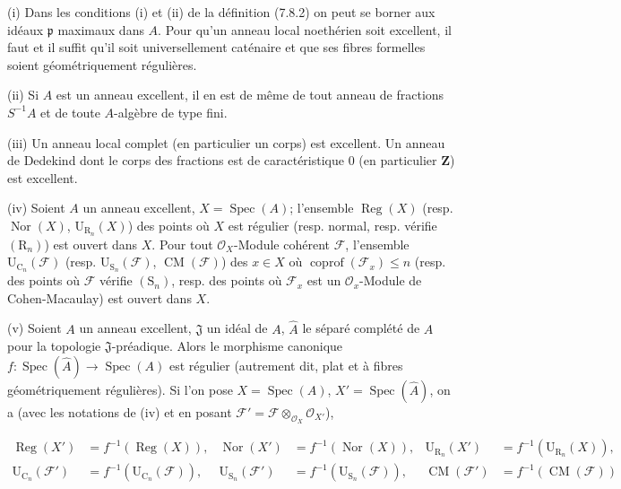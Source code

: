 \begin{scholium}[7.8.3]
\textup{(i)} Dans les conditions \textup{(i)} et \textup{(ii)} de la définition \textup{(7.8.2)} on peut se borner
aux idéaux $\mathfrak p$ maximaux dans $A$. Pour qu'un anneau \textup{local} noethérien
soit excellent, il faut et
il suffit qu'il soit universellement caténaire et que ses fibres formelles
soient géométriquement régulières.

\textup{(ii)} Si $A$ est un anneau excellent, il en est de même de tout anneau de
fractions $S^{-1}A$ et de toute $A$-algèbre de type fini.

\textup{(iii)} Un anneau local complet (en particulier un corps) est excellent. Un
anneau de Dedekind dont le corps des fractions est de caractéristique $0$ (en
particulier $\mathbf Z$) est excellent.

\textup{(iv)} Soient $A$ un anneau excellent, $X=\operatorname{Spec}(A)$; l'ensemble
$\operatorname{Reg}(X)$ \textup{(resp.} $\operatorname{Nor}(X)$,
$\mathrm U_{\mathrm R_n}(X)$) des points où $X$ est régulier \textup{(resp.} normal,
\textup{resp.} vérifie $(\mathrm R_n)$) est ouvert dans $X$. Pour tout
$\mathcal O_X$-Module cohérent $\mathcal F$, l'ensemble
$\mathrm U_{\mathrm C_n}(\mathcal F)$ \textup{(resp.}
$\mathrm U_{\mathrm S_n}(\mathcal F)$, $\operatorname{CM}(\mathcal F)$) des
$x\in X$ où $\operatorname{coprof}(\mathcal F_x)\leq n$ \textup{(resp.} des points où
$\mathcal F$ vérifie $(\mathrm S_n)$, \textup{resp.} des points où $\mathcal F_x$ est un
$\mathcal O_x$-Module de Cohen-Macaulay) est ouvert dans $X$.

\textup{(v)} Soient $A$ un anneau excellent, $\mathfrak J$ un idéal de $A$,
$\widehat A$ le séparé complété de $A$ pour la topologie $\mathfrak J$-préadique.
Alors le morphisme canonique
$f:\operatorname{Spec}(\widehat A)\to\operatorname{Spec}(A)$ est régulier
\textup{(autrement dit,} plat \textup{et à fibres} géométriquement régulières). Si l'on pose
$X=\operatorname{Spec}(A)$, $X'=\operatorname{Spec}(\widehat A)$, on a (avec
les notations de \textup{(iv)} et en posant
$\mathcal F'=\mathcal F\otimes_{\mathcal O_X}\mathcal O_{X'}$),
\begin{env}[7.8.3.1]
\label{IV.2.s7.8.3.1-fr}
\begin{align*}
\operatorname{Reg}(X')&=f^{-1}(\operatorname{Reg}(X)),&
\operatorname{Nor}(X')&=f^{-1}(\operatorname{Nor}(X)),&
\mathrm U_{\mathrm R_n}(X')&=f^{-1}(\mathrm U_{\mathrm R_n}(X)),\\
\mathrm U_{\mathrm C_n}(\mathcal F')&=f^{-1}(\mathrm U_{\mathrm C_n}(\mathcal F)),&
\mathrm U_{\mathrm S_n}(\mathcal F')&=f^{-1}(\mathrm U_{\mathrm S_n}(\mathcal F)),&
\operatorname{CM}(\mathcal F')&=f^{-1}(\operatorname{CM}(\mathcal F))
\end{align*}
\end{env}


\end{scholium}
